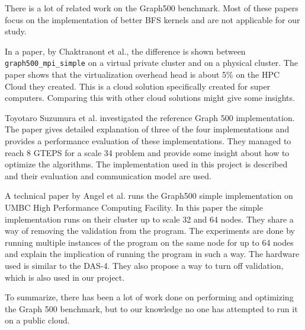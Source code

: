 There is a lot of related work on the Graph500 benchmark. Most of these papers focus on the implementation of better BFS kernels and are not applicable for our study.

In a paper, by Chaktranont et al.\cite{chakthranont2014exploring}, the difference is shown between \texttt{graph500\_mpi\_simple} on a virtual private cluster and on a physical cluster. The paper shows that the  virtualization overhead head is about 5\% on the HPC Cloud they created. This is a cloud solution specifically created for super computers. Comparing this with other cloud solutions might give some insights.

Toyotaro Suzumura et al. \cite{suzumura2011performance} investigated the reference Graph 500 implementation. The paper gives detailed explanation of three of the four implementations and provides a performance evaluation of these implementations. They managed to reach 8 GTEPS for a scale 34 problem and provide some insight about how to optimize the algorithms. The implementation used in this project is described and their evaluation and communication model are used.

A technical paper by Angel et al.\cite{angel2012graph} runs the Graph500 simple implementation on UMBC High Performance Computing Facility. In this paper the simple implementation runs on their cluster up to scale 32 and 64 nodes. They share a way of removing the validation from the program. The experiments are done by running multiple instances of the program on the same node for up to 64 nodes and explain the implication of running the program in such a way. The hardware used is similar to the DAS-4. They also propose a way to turn off validation, which is also used in our project.

To summarize, there has been a lot of work done on performing and optimizing the Graph 500 benchmark, but to our knowledge no one has attempted to run it on a public cloud.